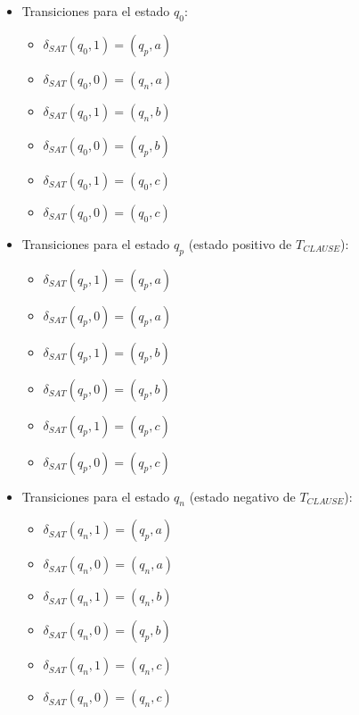 \begin{itemize}
    \item Transiciones para el estado $q_0$:
          \begin{multicols}{2}
              \begin{itemize}
                  \item $\delta_{SAT}(q_0,1)=(q_p,a)$
                  \item $\delta_{SAT}(q_0,0)=(q_n,a)$
                  \item $\delta_{SAT}(q_0,1)=(q_n,b)$
                  \item $\delta_{SAT}(q_0,0)=(q_p,b)$
                  \item $\delta_{SAT}(q_0,1)=(q_0,c)$
                  \item $\delta_{SAT}(q_0,0)=(q_0,c)$
              \end{itemize}
          \end{multicols}
          
    \item Transiciones para el estado $q_p$ (estado positivo de $T_{CLAUSE}$):
          \begin{multicols}{2}
              \begin{itemize}
                  \item $\delta_{SAT}(q_{p},1)=(q_{p},a)$
                  \item $\delta_{SAT}(q_{p},0)=(q_{p},a)$
                  \item $\delta_{SAT}(q_{p},1)=(q_{p},b)$
                  \item $\delta_{SAT}(q_{p},0)=(q_{p},b)$
                  \item $\delta_{SAT}(q_{p},1)=(q_{p},c)$
                  \item $\delta_{SAT}(q_{p},0)=(q_{p},c)$
              \end{itemize}
          \end{multicols}
          
    \item Transiciones para el estado $q_n$ (estado negativo de $T_{CLAUSE}$):
          \begin{multicols}{2}
              \begin{itemize}
                  \item $\delta_{SAT}(q_{n},1)=(q_{p},a)$
                  \item $\delta_{SAT}(q_{n},0)=(q_{n},a)$
                  \item $\delta_{SAT}(q_{n},1)=(q_{n},b)$
                  \item $\delta_{SAT}(q_{n},0)=(q_{p},b)$
                  \item $\delta_{SAT}(q_{n},1)=(q_{n},c)$
                  \item $\delta_{SAT}(q_{n},0)=(q_{n},c)$
              \end{itemize}
          \end{multicols}
\end{itemize}

